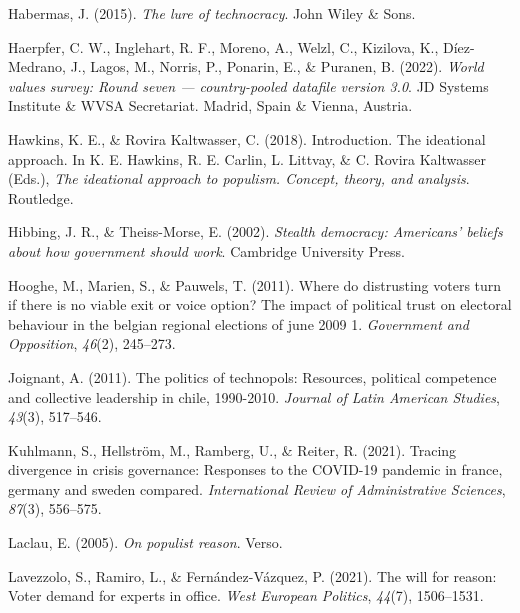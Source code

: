 \documentclass[
  12pt,
  english,
]{article}
\newlength{\cslhangindent}
\newlength{\cslentryspacingunit} %
\newenvironment{CSLReferences}[2] %
 {%
  \setlength{\parindent}{0pt}
  \ifodd #1
  \let\oldpar\par
  \def\par{\hangindent=\cslhangindent\oldpar}
  \fi
  \setlength{\parskip}{#2\cslentryspacingunit}
 }%
 {}
\begin{document}
\begin{CSLReferences}{1}{0}
\leavevmode{}%
Habermas, J. (2015). \emph{The lure of technocracy}. John Wiley \& Sons.

\leavevmode{}%
Haerpfer, C. W., Inglehart, R. F., Moreno, A., Welzl, C., Kizilova, K.,
Díez-Medrano, J., Lagos, M., Norris, P., Ponarin, E., \& Puranen, B.
(2022). \emph{World values survey: Round seven --- country-pooled
datafile version 3.0}. JD Systems Institute \& WVSA Secretariat. Madrid,
Spain \& Vienna, Austria.

\leavevmode{}%
Hawkins, K. E., \& Rovira Kaltwasser, C. (2018). Introduction. The
ideational approach. In K. E. Hawkins, R. E. Carlin, L. Littvay, \& C.
Rovira Kaltwasser (Eds.), \emph{The ideational approach to populism.
Concept, theory, and analysis}. Routledge.

\leavevmode{}%
Hibbing, J. R., \& Theiss-Morse, E. (2002). \emph{Stealth democracy:
Americans' beliefs about how government should work}. Cambridge
University Press.

\leavevmode{}%
Hooghe, M., Marien, S., \& Pauwels, T. (2011). Where do distrusting
voters turn if there is no viable exit or voice option? The impact of
political trust on electoral behaviour in the belgian regional elections
of june 2009 1. \emph{Government and Opposition}, \emph{46}(2),
245--273.

\leavevmode{}%
Joignant, A. (2011). The politics of technopols: Resources, political
competence and collective leadership in chile, 1990-2010. \emph{Journal
of Latin American Studies}, \emph{43}(3), 517--546.

\leavevmode{}%
Kuhlmann, S., Hellström, M., Ramberg, U., \& Reiter, R. (2021). Tracing
divergence in crisis governance: Responses to the COVID-19 pandemic in
france, germany and sweden compared. \emph{International Review of
Administrative Sciences}, \emph{87}(3), 556--575.

\leavevmode{}%
Laclau, E. (2005). \emph{On populist reason}. Verso.

\leavevmode{}%
Lavezzolo, S., Ramiro, L., \& Fernández-Vázquez, P. (2021). The will for
reason: Voter demand for experts in office. \emph{West European
Politics}, \emph{44}(7), 1506--1531.


\end{CSLReferences}
\end{document}
